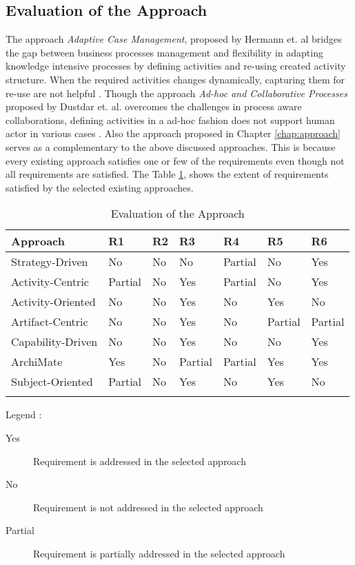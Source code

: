 \subsection {Evaluation of the Approach}
 The approach \textit{Adaptive Case Management}, proposed by Hermann et. al \cite{Herrmann2011} bridges the gap between business processes management and flexibility in adapting knowledge intensive processes by defining activities and re-using created activity structure. When the required activities changes dynamically, capturing them for re-use are not helpful \cite{Sungur2015}. Though the approach \textit{Ad-hoc and Collaborative Processes} proposed by Dustdar et. al. overcomes the challenges in process aware collaborations, defining activities in a ad-hoc fashion does not support human actor in various cases \cite{Sungur2015}. Also the approach proposed in Chapter \ref{chap:approach} serves as a complementary to the above discussed  approaches.  This is because every existing approach satisfies one or few of the requirements even though not all requirements are satisfied. The Table \ref{tab:evaluationoftheapproach}, shows the extent of requirements satisfied by the selected existing approaches. 

\begin{center}
	\begin{longtable}{p{6cm}p{1.5cm}p{1.5cm}p{1.5cm}p{1.5cm}p{1.5cm}p{1.5cm}} 
		\toprule 
		\textbf{Approach} & \textbf{R1}  & \textbf{R2}  & \textbf{R3}  & \textbf{R4}  & \textbf{R5} & \textbf{R6} \\
		\midrule
		\endfirsthead
		
		Strategy-Driven & No  & No  & No  & Partial  & No  & Yes\\
		Activity-Centric   & Partial   & No  & Yes  & Partial  & No  & Yes \\
		Activity-Oriented    & No  & No  & Yes  & No   & Yes  & No \\
		Artifact-Centric    & No  & No  & Yes  & No & Partial  & Partial \\ 
		Capability-Driven   & No  & No  & Yes  & No  & No  & Yes\\
		ArchiMate  & Yes  & No  & Partial  & Partial  & Yes  & Yes \\
		Subject-Oriented   &Partial  & No  & Yes  & No   & Yes   & No\\
		
		\bottomrule
		\caption{Evaluation of the Approach}
		\label{tab:evaluationoftheapproach}
	\end{longtable}	
\end{center}
Legend :
\begin{description}
	\item[Yes]      Requirement is addressed in the selected approach
	\item[No]       Requirement is not addressed in the selected approach
	\item[Partial]  Requirement is partially addressed in the selected approach
\end{description}



 


